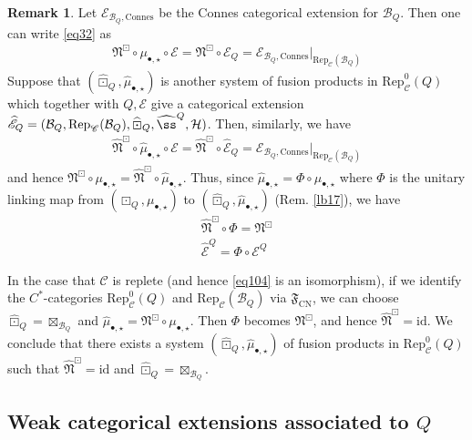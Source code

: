 \documentclass[11pt,b5paper,notitlepage]{article}
\theoremstyle{definition}
\newtheorem{rem}[df]{Remark}
\theoremstyle{plain}
\newcommand{\fk}{\mathfrak}
\newcommand{\mc}{\mathcal}
\newcommand{\wht}{\widehat}
\newcommand{\id}{\mathrm{id}}
\newcommand{\Rep}{\mathrm{Rep}}
\newcommand{\scr}{\mathscr}
\newcommand{\blt}{\bullet}
\newcommand{\CN}{{\scriptscriptstyle \mathrm{CN}}}
\newcommand{\Connes}{\mathrm{Connes}}
\numberwithin{equation}{section}
\begin{document}
\begin{rem}\label{lb68}
Let $\scr E_{\mc B_Q,\Connes}$ be the Connes categorical extension for $\mc B_Q$. Then one can write \eqref{eq32} as
\begin{align}
\fk N^\boxdot\circ\mu_{\blt,\star}\circ\scr E=\fk N^\boxdot\circ\scr E_Q=\scr E_{\mc B_Q,\Connes}\big|_{\Rep_{\scr C}(\mc B_Q)}
\end{align}
Suppose that $(\wht\boxdot_Q,\wht\mu_{\blt,\star})$ is another system of fusion products in $\Rep^0_{\scr C}(Q)$ which together with $Q,\scr E$ give a categorical extension $\wht{\scr E}_Q=(\mc B_Q,\Rep_{\scr C}(\mc B_Q),\wht\boxdot_Q,\wht\ss^Q,\mc H)$. Then, similarly, we have
\begin{align*}
\wht{\fk N}^\boxdot\circ\wht\mu_{\blt,\star}\circ\scr E=\wht{\fk N}^\boxdot\circ\wht{\scr E}_Q=\scr E_{\mc B_Q,\Connes}\big|_{\Rep_{\scr C}(\mc B_Q)}
\end{align*}
and hence $\fk N^\boxdot\circ\mu_{\blt,\star}=\wht{\fk N}^\boxdot\circ\wht\mu_{\blt,\star}$. Thus, since $\wht\mu_{\blt,\star}=\Phi\circ\mu_{\blt,\star}$ where $\Phi$ is the unitary linking map from $(\boxdot_Q,\mu_{\blt,\star})$ to $(\wht\boxdot_Q,\wht\mu_{\blt,\star})$ (Rem. \ref{lb17}), we have
\begin{subequations}
\begin{gather}
\wht{\fk N}^\boxdot\circ\Phi=\fk N^\boxdot \label{eq55}\\
\wht{\scr E}^Q=\Phi\circ\scr E^Q \label{eq33}
\end{gather}
\end{subequations}

In the case that $\scr C$ is replete (and hence \eqref{eq104} is an isomorphism), if we identify the $C^*$-categories $\Rep^0_{\scr C}(Q)$ and $\Rep_{\scr C}(\mc B_Q)$ via $\fk F_\CN$, we can choose $\wht\boxdot_Q=\boxtimes_{\mc B_Q}$ and $\wht\mu_{\blt,\star}=\fk N^\boxdot\circ\mu_{\blt,\star}$. Then $\Phi$ becomes $\fk N^\boxdot$, and hence $\wht{\fk N}^\boxdot=\id$. We conclude that there exists a system $(\wht\boxdot_Q,\wht\mu_{\blt,\star})$ of fusion products in $\Rep^0_{\scr C}(Q)$ such that $\wht{\fk N}^\boxdot=\id$ and $\wht\boxdot_Q=\boxtimes_{\mc B_Q}$. %
\end{rem}


\subsection{Weak categorical extensions associated to $Q$}
\end{document}
